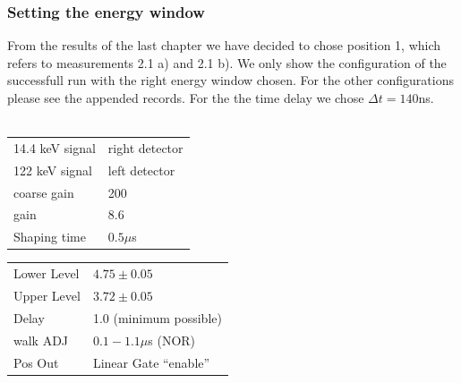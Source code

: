 \subsubsection{Setting the energy window}
\label{ssub:Setting the energy window}
From the results of the last chapter we have decided to chose position 1, which refers to measurements 2.1 a)
and 2.1 b). We only show the configuration of the successfull run with the right energy window chosen.
For the other configurations please see the appended records. For the the time delay we chose
$\Delta t = 140$ns.\\\\ 
 \begin{minipage}{\textwidth}
  \begin{minipage}[b]{0.49\textwidth}
   \begin{tabular}{|l|l|}
        \hline
       14.4 keV signal & right detector \\
       122 keV signal & left detector \\
       coarse gain & 200 \\
       gain & 8.6 \\
       Shaping time & $0.5\mu$s \\
        \hline
   \end{tabular}

  \end{minipage}
  \hfill
  \begin{minipage}[b]{0.49\textwidth}
    \centering
   \begin{tabular}{|l|l|}
        \hline
       Lower Level & $4.75\pm0.05$ \\
       Upper Level & $3.72\pm0.05$ \\
       Delay & 1.0 (minimum possible) \\
        walk ADJ & $0.1 - 1.1\mu$s (NOR)  \\
       Pos Out & Linear Gate ``enable''\\
        \hline
   \end{tabular}
\end{minipage}
\end{minipage}
